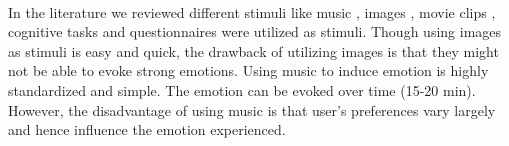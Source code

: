 \paragraph{} In the literature we reviewed different stimuli like music \cite{kim_emotion_2008} , images \cite{kanade_emotion_2004} \cite{kordic_emotion_2010}, movie clips \cite{lisetti_using_2004} \cite{wan_wen_2009} \cite{schulze_cnn_2016}, cognitive tasks and questionnaires \cite{grimm_bimodal_2007} were utilized as stimuli. Though using images as stimuli is easy and quick, the drawback of utilizing images is that they might not be able to evoke strong emotions. Using music to induce emotion is highly standardized and simple. The emotion can be evoked over time (15-20 min). However, the disadvantage of using music is that user's preferences vary largely and hence influence the emotion experienced.
